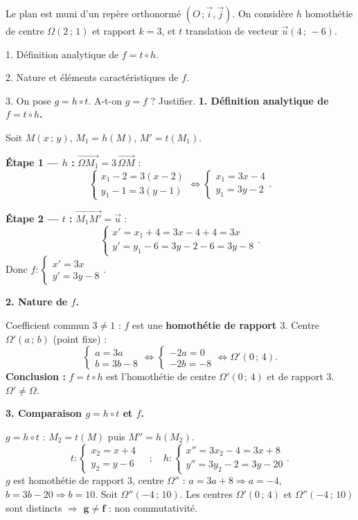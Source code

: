 \documentclass[11pt]{article}
\begin{document}
\begin{exoresolu}
Le plan est muni d'un repère orthonormé $(O\,;\vec{i},\vec{j})$. On considère $h$ homothétie de centre $\Omega(2\,;\,1)$ et rapport $k=3$, et $t$ translation de vecteur $\vec{u}(4\,;\,-6)$.

1. Définition analytique de $f = t \circ h$.

2. Nature et éléments caractéristiques de $f$.

3. On pose $g = h \circ t$. A-t-on $g = f$ ? Justifier.
\tcblower
\textbf{1. Définition analytique de $f = t \circ h$.}

Soit $M(x\,;\,y)$, $M_1 = h(M)$, $M' = t(M_1)$.

\textbf{Étape 1 — $h$ :} $\overrightarrow{\Omega M_1} = 3\,\overrightarrow{\Omega M}$ :
\[ \begin{cases} x_1 - 2 = 3(x - 2) \\ y_1 - 1 = 3(y - 1) \end{cases} \iff \begin{cases} x_1 = 3x - 4 \\ y_1 = 3y - 2 \end{cases}. \]

\textbf{Étape 2 — $t$ :} $\overrightarrow{M_1 M'} = \vec{u}$ :
\[ \begin{cases} x' = x_1 + 4 = 3x - 4 + 4 = 3x \\ y' = y_1 - 6 = 3y - 2 - 6 = 3y - 8 \end{cases}. \]
Donc $f : \begin{cases} x' = 3x \\ y' = 3y - 8 \end{cases}$.

\textbf{2. Nature de $f$.}

Coefficient commun $3 \neq 1$ : $f$ est une \textbf{homothétie de rapport $3$}. Centre $\Omega'(a\,;\,b)$ (point fixe) :
\[ \begin{cases} a = 3a \\ b = 3b - 8 \end{cases} \iff \begin{cases} -2a = 0 \\ -2b = -8 \end{cases} \iff \Omega'(0\,;\,4). \]
\textbf{Conclusion :} $f = t \circ h$ est l'homothétie de centre $\Omega'(0\,;\,4)$ et de rapport $3$. $\Omega' \neq \Omega$.

\textbf{3. Comparaison $g = h \circ t$ et $f$.}

$g = h \circ t$ : $M_2 = t(M)$ puis $M'' = h(M_2)$.
\[ t : \begin{cases} x_2 = x + 4 \\ y_2 = y - 6 \end{cases} \quad ; \quad h : \begin{cases} x'' = 3x_2 - 4 = 3x + 8 \\ y'' = 3y_2 - 2 = 3y - 20 \end{cases}. \]
$g$ est homothétie de rapport $3$, centre $\Omega''$ : $a = 3a+8 \Rightarrow a=-4$, $b=3b-20 \Rightarrow b=10$. Soit $\Omega''(-4\,;\,10)$.
Les centres $\Omega'(0\,;\,4)$ et $\Omega''(-4\,;\,10)$ sont distincts $\Rightarrow$ $\mathbf{g \neq f}$ : non commutativité.
\end{exoresolu}
\end{document}
